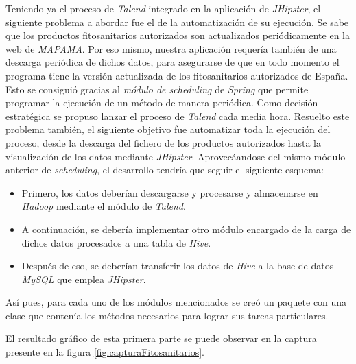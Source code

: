 \par
Teniendo ya el proceso de \textit{Talend} integrado en la aplicación de \textit{JHipster}, el siguiente problema a abordar fue el de la automatización de su ejecución. Se sabe que los productos fitosanitarios autorizados son actualizados periódicamente en la web de \textit{MAPAMA}. Por eso mismo, nuestra aplicación requería también de una descarga periódica de dichos datos, para asegurarse de que en todo momento el programa tiene la versión actualizada de los fitosanitarios autorizados de España. Esto se consiguió gracias al \textit{módulo de scheduling}\cite{spring_scheduling} de \textit{Spring} que permite programar la ejecución de un método de manera periódica. Como decisión estratégica se propuso lanzar el proceso de \textit{Talend} cada media hora. Resuelto este problema también, el siguiente objetivo fue automatizar toda la ejecución del proceso, desde la descarga del fichero de los productos autorizados hasta la visualización de los datos mediante \textit{JHipster}. Aprovecáandose del mismo módulo anterior de \textit{scheduling}, el desarrollo tendría que seguir el siguiente esquema: 
\begin{itemize}
\item Primero, los datos deberían descargarse y procesarse y almacenarse en \textit{Hadoop} mediante el módulo de \textit{Talend}.
\item A continuación, se debería implementar otro módulo encargado de la carga de dichos datos procesados a una tabla de \textit{Hive}.
\item Después de eso, se deberían transferir los datos de \textit{Hive} a la base de datos \textit{MySQL} que emplea \textit{JHipster}.
\end{itemize}
  \par Así pues, para cada uno de los módulos mencionados se creó un paquete con una clase que contenía los métodos necesarios para lograr sus tareas particulares.
\par El resultado gráfico de esta primera parte se puede observar en la captura presente en la figura \ref{fig:capturaFitosanitarios}.



